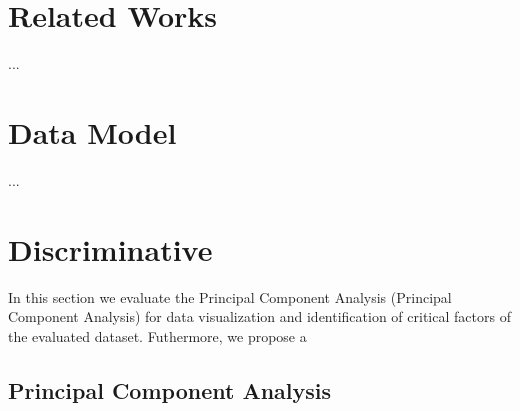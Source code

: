 \section{Related Works}
\label{sec:relatedworks}

...

\section{Data Model}
\label{sec:datamodel}

...

\section{Discriminative}
\label{sec:prop_getv}

In this section we evaluate the Principal Component Analysis (Principal Component Analysis) for data visualization and identification of critical factors of the evaluated dataset. Futhermore, we propose a 

\subsection{Principal Component Analysis}

